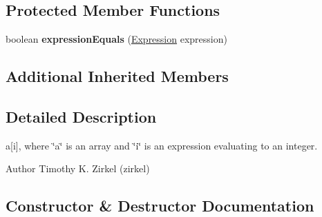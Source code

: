 \subsection*{Protected Member Functions}
\begin{DoxyCompactItemize}
\item 
\hypertarget{classedu_1_1udel_1_1cis_1_1vsl_1_1civl_1_1model_1_1common_1_1expression_1_1CommonSubscriptExpression_a184ba7ee889a63de26fcff515449cb9c}{}boolean {\bfseries expression\+Equals} (\hyperlink{interfaceedu_1_1udel_1_1cis_1_1vsl_1_1civl_1_1model_1_1IF_1_1expression_1_1Expression}{Expression} expression)\label{classedu_1_1udel_1_1cis_1_1vsl_1_1civl_1_1model_1_1common_1_1expression_1_1CommonSubscriptExpression_a184ba7ee889a63de26fcff515449cb9c}

\end{DoxyCompactItemize}
\subsection*{Additional Inherited Members}


\subsection{Detailed Description}
a\mbox{[}i\mbox{]}, where \char`\"{}a\char`\"{} is an array and \char`\"{}i\char`\"{} is an expression evaluating to an integer. 

\begin{DoxyAuthor}{Author}
Timothy K. Zirkel (zirkel) 
\end{DoxyAuthor}


\subsection{Constructor \& Destructor Documentation}
\hypertarget{classedu_1_1udel_1_1cis_1_1vsl_1_1civl_1_1model_1_1common_1_1expression_1_1CommonSubscriptExpression_af56e47c7dfc7a44d91ec18cbbaa30d3e}{}
